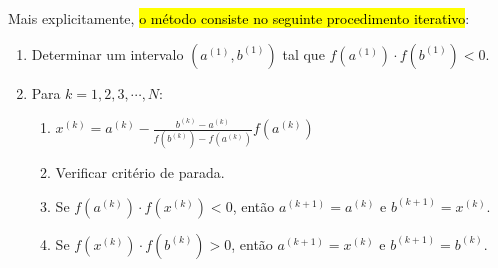 Mais explicitamente, \hl{o método consiste no seguinte procedimento iterativo}:
\begin{enumerate}
\item Determinar um intervalo $(a^{(1)}, b^{(1)})$ tal que $f(a^{(1)})\cdot f(b^{(1)}) < 0$.
\item Para $k = 1, 2, 3, \cdots, N$:
  \begin{enumerate}[2.1]
  \item $\displaystyle x^{(k)} = a^{(k)} - \frac{b^{(k)}-a^{(k)}}{f(b^{(k)})-f(a^{(k)})}f(a^{(k)})$
  \item Verificar critério de parada.
  \item Se $f(a^{(k)})\cdot f(x^{(k)}) < 0$, então $a^{(k+1)}=a^{(k)}$ e $b^{(k+1)}=x^{(k)}$.
  \item Se $f(x^{(k)})\cdot f(b^{(k)}) > 0$, então $a^{(k+1)}=x^{(k)}$ e $b^{(k+1)}=b^{(k)}$.
  \end{enumerate}
\end{enumerate}

